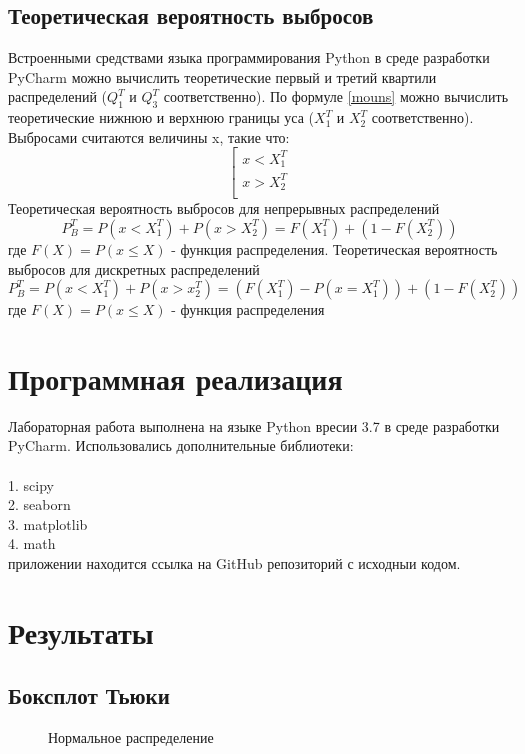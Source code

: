 \documentclass[a4paper]{article}
\begin{document}
\subsection{Теоретическая вероятность выбросов}
	\noindent Встроенными средствами языка программирования Python в среде разработки PyCharm можно вычислить теоретические первый и третий квартили распределений ($Q_1^T$ и $Q_3^T$ соответственно). По формуле \eqref{mouns} можно вычислить теоретические нижнюю и верхнюю границы уса ($X_1^T$ и $X_2^T$ соответственно). Выбросами считаются величины x, такие что: 
	\begin{equation}
		\left[
		\begin{gathered}
		x < X_1^T \\
		x > X_2^T \\
		\end{gathered}
		\right.
	\end{equation}
	Теоретическая вероятность выбросов для непрерывных распределений
	\begin{equation}
		P_B^T = P(x<X_1^T) + P(x>X_2^T)=F(X_1^T) + (1-F(X_2^T))
	\end{equation}
	где $F(X)=P(x\leq{X})$ - функция распределения.
	Теоретическая вероятность выбросов для дискретных распределений
	\begin{equation}
		P_B^T = P(x<X_1^T)+P(x>x_2^T)=(F(X_1^T)-P(x=X_1^T))+(1-F(X_2^T))
	\end{equation}
	где $F(X) = P(x\leq{X})$ - функция распределения
	
\section{Программная реализация}
\noindent Лабораторная работа выполнена на языке Python вресии 3.7 в среде разработки PyCharm. Использовались дополнительные библиотеки:\\\\ 
1. scipy \\
2. seaborn \\
3. matplotlib\\
4. math\\

 приложении находится ссылка на GitHub репозиторий с исходныи кодом.

\section {Результаты} 
\subsection{Боксплот Тьюки}
\begin{figure}[H]
\label{fig:image}
\caption{Нормальное распределение} 
\end{figure}
	
\end{document}
